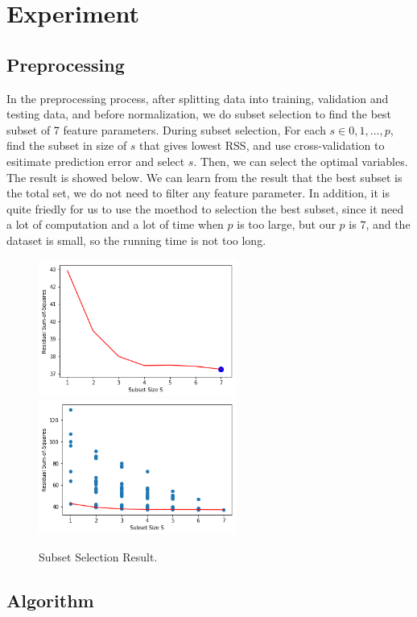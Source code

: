 \documentclass{article}
\begin{document}
\section{Experiment}
\label{headings}

\subsection{Preprocessing}

In the preprocessing process, after splitting data into training, validation and testing data, and before normalization, we do subset selection to find the best subset of 7 feature parameters. During subset selection, For each $s \in 0, 1, ... , p$, find the subset in size of $s$ that gives lowest RSS, and use cross-validation to esitimate prediction error and select $s$. Then, we can select the optimal variables. The result is showed below. We can learn from the result that the best subset is the total set, we do not need to filter any feature parameter. In addition, it is quite friedly for us to use the moethod to selection the best subset, since it need a lot of computation and a lot of time when $p$ is too large, but our $p$ is $7$, and the dataset is small, so the running time is not too long.

\begin{figure}[h]
	\centering
	\includegraphics[width=6.5cm]{preprocessing.jpg}
	\includegraphics[width=6.5cm]{preprocessing2.jpg}
	\caption{Subset Selection Result.}
\end{figure}

\subsection{Algorithm}
\end{document}
